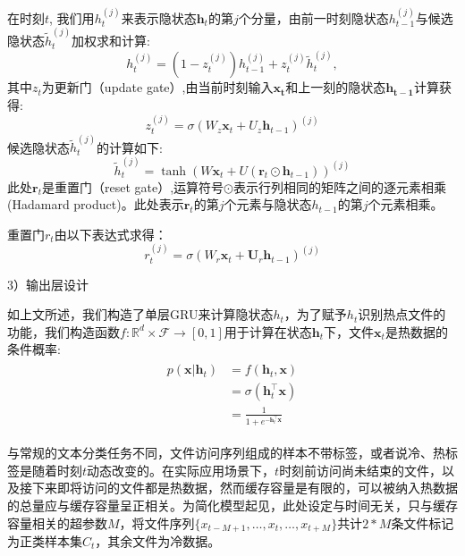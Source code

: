 在时刻$t$, 我们用$h_t^{(j)}$来表示隐状态$\mathbf{h}_t$的第$j$个分量，由前一时刻隐状态$h_{t-1}^{(j)}$与候选隐状态$\tilde{h}_t^{(j)}$加权求和计算:
\begin{equation}
    h_t^{(j)} = (1-z_t^{(j)}) h_{t-1}^{(j)} + z_t^{(j)}\tilde{h}_t^{(j)},
\end{equation}
其中$z_t$为更新门（update gate）,由当前时刻输入$\mathbf{x_t}$和上一刻的隐状态$\mathbf{h_{t-1}}$计算获得:
\begin{equation}
z_t^{(j)} = \sigma(W_z \mathbf{x}_t + U_z \mathbf{h}_{t-1})^{(j)}
\end{equation}
候选隐状态$\tilde{h}_t^{(j)}$的计算如下:
\begin{equation}
    \tilde{h}_t^{(j)} = \tanh(W \mathbf{x}_t + U (\mathbf{r}_t \odot \mathbf{h}_{t-1}))^{(j)}
\end{equation}
此处$\mathbf{r}_t$是重置门（reset gate）,运算符号$\odot$表示行列相同的矩阵之间的逐元素相乘(Hadamard product)。此处表示$\mathbf{r}_t$的第$j$个元素与隐状态$h_{t-1}$的第$j$个元素相乘。

重置门$r_t$由以下表达式求得：
\begin{equation}
    r_t^{(j)} = \sigma(W_r \mathbf{x}_t + \mathbf{U}_r \mathbf{h}_{t-1})^{(j)}
\end{equation}

3）输出层设计

如上文所述，我们构造了单层GRU来计算隐状态$h_t$，为了赋予$h_t$识别热点文件的功能，我们构造函数$f:\mathbb{R}^d \times \mathcal{F} \rightarrow [0,1]$用于计算在状态$\mathbf{h}_t$下，文件$\mathbf{x}_t$是热数据的条件概率:
\begin{align}
    \begin{split}
    p(\mathbf{x} | \mathbf{h}_t) &= f(\mathbf{h}_t,\mathbf{x}) \\
                                &= \sigma(\mathbf{h}_t^{\top} \mathbf{x}) \\
                                &= \frac{1}{1+e^{-\mathbf{h}_t^{\top} \mathbf{x}}}
    \end{split}
\end{align}

与常规的文本分类任务不同，文件访问序列组成的样本不带标签，或者说冷、热标签是随着时刻$t$动态改变的。在实际应用场景下，$t$时刻前访问尚未结束的文件，以及接下来即将访问的文件都是热数据，然而缓存容量是有限的，可以被纳入热数据的总量应与缓存容量呈正相关。为简化模型起见，此处设定与时间无关，只与缓存容量相关的超参数$M$，将文件序列$\{ x_{t-M+1},\dots,x_t,\dots,x_{t+M} \}$共计$2*M$条文件标记为正类样本集$C_t$，其余文件为冷数据。

